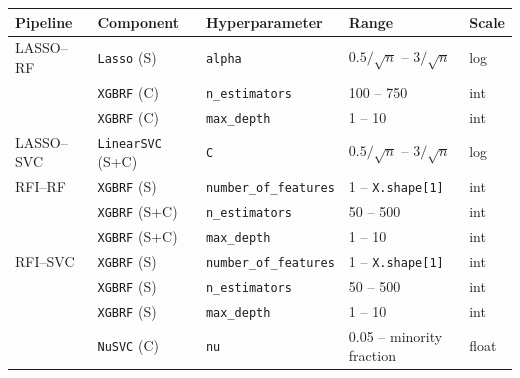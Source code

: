 {\footnotesize\setlength{\tabcolsep}{2.5pt}%
\begin{tabular}{lllll}
\toprule
Pipeline & Component & Hyperparameter & Range & Scale \\
\midrule
LASSO--RF  & \texttt{Lasso} (S)       & \texttt{alpha}                & $0.5/\sqrt{n}$ -- $3/\sqrt{n}$ & log \\
           & \texttt{XGBRF} (C)       & \texttt{n\_estimators}        & 100 -- 750                     & int \\
           & \texttt{XGBRF} (C)       & \texttt{max\_depth}           & 1 -- 10                        & int \\
\midrule
LASSO--SVC & \texttt{LinearSVC} (S+C) & \texttt{C}                    & $0.5/\sqrt{n}$ -- $3/\sqrt{n}$ & log \\
\midrule
RFI--RF    & \texttt{XGBRF} (S)       & \texttt{number\_of\_features} & 1 -- \texttt{X.shape[1]}       & int \\
           & \texttt{XGBRF} (S+C)     & \texttt{n\_estimators}        & 50 -- 500                      & int \\
           & \texttt{XGBRF} (S+C)     & \texttt{max\_depth}           & 1 -- 10                        & int \\
\midrule
RFI--SVC   & \texttt{XGBRF} (S)       & \texttt{number\_of\_features} & 1 -- \texttt{X.shape[1]}       & int \\
           & \texttt{XGBRF} (S)       & \texttt{n\_estimators}        & 50 -- 500                      & int \\
           & \texttt{XGBRF} (S)       & \texttt{max\_depth}           & 1 -- 10                        & int \\
           & \texttt{NuSVC} (C)       & \texttt{nu}                   & 0.05 -- minority fraction      & float \\
\bottomrule
\end{tabular}}
